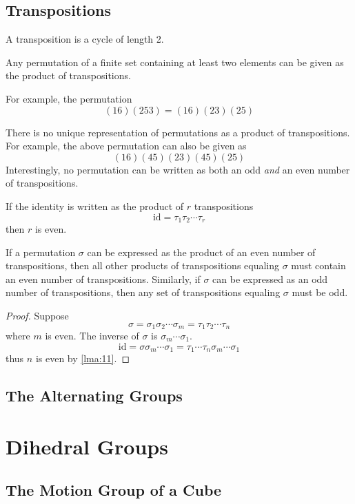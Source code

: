 \documentclass[12pt, letterpaper]{report}
\begin{document}
\subsection*{Transpositions}
\begin{definition}[Transposition]
	A transposition is a cycle of length 2.
\end{definition}
\begin{proposition}
	Any permutation of a finite set containing at least two elements can be given as the product of transpositions.
\end{proposition}
\begin{eg}
	For example, the permutation
	\[
		(16)(253)=(16)(23)(25)
	\]
\end{eg}
There is no unique representation of permutations as a product of transpositions. For example, the above permutation can also be given as
\[
	(16)(45)(23)(45)(25)
\]
Interestingly, no permutation can be written as both an odd \emph{and} an even number of transpositions. 
\begin{lemma}\label{lma:11}
	If the identity is written as the product of \(r\) transpositions 
	\[
		\text{id}=\tau _1 \tau _2 \cdots \tau _r 
	\]
	then \(r\) is even.
\end{lemma}
\begin{theorem}
	If a permutation \(\sigma \) can be expressed as the product of an even number of transpositions, then all other products of transpositions equaling \(\sigma \) must contain an even number of transpositions. Similarly, if \(\sigma \) can be expressed as an odd number of transpositions, then any set of transpositions equaling \(\sigma \) must be odd.
\end{theorem}
\begin{proof}
	Suppose 
	\[
		\sigma =\sigma _1 \sigma _2\cdots \sigma _m =\tau _1 \tau _2 \cdots \tau _n
	\]
	where \(m\) is even. The inverse of \(\sigma \) is \(\sigma _m \cdots \sigma _1\).
	\[
		\text{id} =\sigma \sigma _m \cdots \sigma _1=\tau _1\cdots \tau _n \sigma _m\cdots \sigma _1
	\]
thus \(n\) is even by \ref{lma:11}.
\end{proof}
\subsection*{The Alternating Groups}
\section{Dihedral Groups}
\subsection*{The Motion Group of a Cube}
\end{document}
